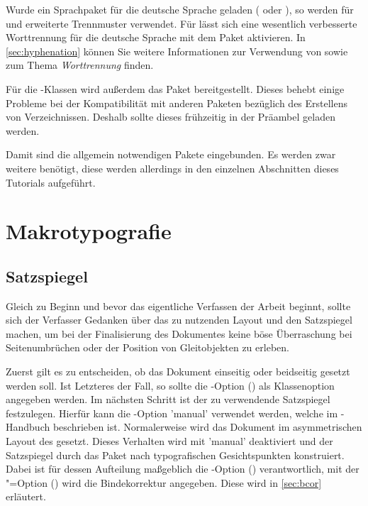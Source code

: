 \documentclass[%
  english,ngerman,%
  cdgeometry=no,DIV=12,automark%
]{tudscrartcl}
\begin{document}
Wurde ein Sprachpaket für die deutsche Sprache geladen ( oder 
), so werden für  und  
erweiterte Trennmuster verwendet. Für  lässt sich eine 
wesentlich verbesserte Worttrennung für die deutsche Sprache mit dem Paket 
 aktivieren. In \autoref{sec:hyphenation} können Sie weitere 
Informationen zur Verwendung von  sowie zum Thema 
\emph{Worttrennung} finden.
%
\begin{Preamble}
\usepackage[T1]{fontenc}
\ifpdftex{\usepackage[ngerman=ngerman-x-latest]{hyphsubst}}{}
\end{Preamble}
%
Für die \KOMAScript-Klassen wird außerdem das Paket  
bereitgestellt. Dieses behebt einige Probleme bei der Kompatibilität mit 
anderen Paketen bezüglich des Erstellens von Verzeichnissen. Deshalb sollte 
dieses frühzeitig in der Präambel geladen werden. 
%
\begin{Preamble}
\usepackage{scrhack}
\end{Preamble}
%
Damit sind die allgemein notwendigen Pakete eingebunden. Es werden zwar weitere 
benötigt, diese werden allerdings in den einzelnen Abschnitten dieses Tutorials 
aufgeführt.



\section{Makrotypografie}
\subsection{Satzspiegel}
Gleich zu Beginn und bevor das eigentliche Verfassen der Arbeit beginnt, sollte 
sich der Verfasser Gedanken über das zu nutzenden Layout und den Satzspiegel 
machen, um bei der Finalisierung des Dokumentes keine böse Überraschung bei 
Seitenumbrüchen oder der Position von Gleitobjekten zu erleben.

Zuerst gilt es zu entscheiden, ob das Dokument einseitig oder beidseitig 
gesetzt werden soll. Ist Letzteres der Fall, so sollte die \KOMAScript-Option 
() als Klassenoption angegeben werden. Im 
nächsten Schritt ist der zu verwendende Satzspiegel festzulegen. Hierfür kann 
die \TUDScript-Option 'manual' verwendet werden, welche im 
\TUDScript-Handbuch beschrieben ist. Normalerweise wird das Dokument im 
asymmetrischen Layout des \CDs gesetzt.
%
Dieses Verhalten wird mit 'manual' deaktiviert und 
der Satzspiegel durch das Paket  nach typografischen 
Gesichtspunkten konstruiert. Dabei ist für dessen Aufteilung maßgeblich die 
\KOMAScript-Option () verantwortlich, mit der 
\KOMAScript"=Option () wird die Bindekorrektur 
angegeben. Diese wird in \autoref{sec:bcor} erläutert.
\end{document}
